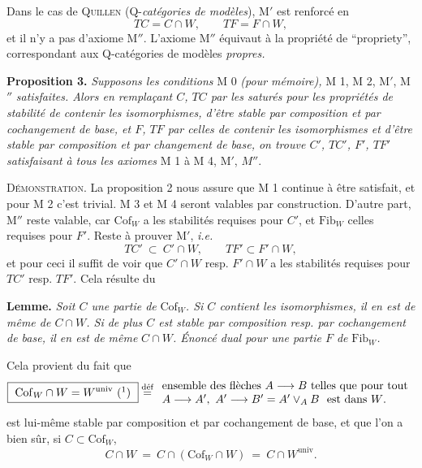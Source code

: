 \documentclass[11pt]{article}
\newcommand{\printedpage}[1]{\marginpar{\footnotesize p.~#1}}
\newcommand{\msp}[1]{\marginpar{\footnotesize [#1]}}
\newcommand{\Cof}{\mathrm{Cof}}
\newcommand{\Fib}{\mathrm{Fib}}
\begin{document}
Dans le cas de \textsc{Quillen} (Q-\textit{catégories de modèles}), M$'$ est renforcé en
\[
TC=C\cap W,\qquad TF=F\cap W,
\]
et il n'y a pas d'axiome M$''$. L'axiome M$''$ équivaut à la propriété de “propriety”, correspondant aux Q-catégories de modèles \textit{propres.}

\textbf{Proposition 3.} \textit{Supposons les conditions} M 0 \textit{(pour mémoire),} M 1, M 2, M$'$, M$''$ \textit{satisfaites. Alors en remplaçant $C$, $TC$ par les saturés pour les propriétés de stabilité de contenir les isomorphismes, d'être stable par composition et par cochangement de base, et $F$, $TF$ par celles de contenir les isomorphismes et d'être stable par composition et par changement de base, on trouve $C'$, $TC'$, $F'$, $TF'$ satisfaisant}
\printedpage{6}
\msp{page 9}\textit{à tous les axiomes} M 1 à M 4, M$'$, $M''$. %

\textsc{Démonstration}. La proposition 2 nous assure que M 1 continue à être satisfait, et pour M 2 c'est trivial. M 3 et M 4 seront valables par construction. D'autre part, M$''$ reste valable, car $\Cof_W$ a les stabilités requises pour $C'$, et $\Fib_W$ celles requises pour $F'$. Reste à prouver M$'$, \textit{i.e.}
\[
TC'\ \subset\ C'\cap W,\qquad TF'\subset F'\cap W,
\]
et pour ceci il suffit de voir que $C'\cap W$ resp. $F'\cap W$ a les stabilités requises pour $TC'$ resp. $TF'$. Cela résulte du

\textbf{Lemme.} \textit{Soit $C$ une partie de} $\Cof_W$\textit{. Si $C$ contient les isomorphismes, il en est de même de $C\cap W$. Si de plus $C$ est stable par composition resp. par cochangement de base, il en est de même} \textit{$C\cap W$. Énoncé dual pour une partie $F$ de} $\Fib_W$\textit{.}

Cela provient du fait que
\[
\boxed{\ \Cof_W\cap W=W^{\mathrm{univ}}\ (\mbox{\footnotemark})\ }
\stackrel{\text{déf}}{=}
\begin{array}{l}
\text{ensemble des flèches $A\longrightarrow B$ telles que pour tout}\\
A\longrightarrow A',\ A'\longrightarrow B'=A'\vee_A B\ \ \text{est dans $W$.}
\end{array}
\]
est lui-même stable par composition et par cochangement de base, et que l'on a bien sûr, si $C\subset\Cof_W$,
\[
C\cap W\ =\ C\cap(\Cof_W\cap W)\ =\ C\cap W^{\mathrm{univ}}.
\]
\end{document}
